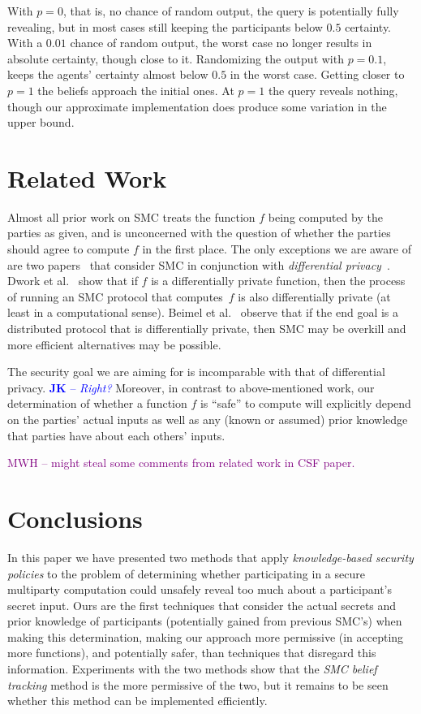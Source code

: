 \documentclass[10pt]{sigplanconf}
\newcommand{\mwh}[1]{\textcolor{purple}{MWH -- #1}}
\newcommand{\jnote}[1]{\textcolor{blue}{{\bf JK} -- \emph{#1}}}
\newcommand{\mwh}[1]{}
\newcommand{\jnote}[1]{}
\begin{document}
With $ p = 0 $, that is, no chance of random output, the query is
potentially fully revealing, but in most cases still keeping the
participants below $ 0.5 $ certainty. With a $ 0.01 $ chance of random
output, the worst case no longer results in absolute certainty, though
close to it. Randomizing the output with $ p = 0.1 $, keeps the
agents' certainty almost below $ 0.5 $ in the worst case.  Getting
closer to $ p = 1 $ the beliefs approach the initial ones. At $ p = 1
$ the query reveals nothing, though our approximate implementation
does produce some variation in the upper bound.

\section{Related Work}
Almost all prior work on SMC treats the function $f$ being computed by
the parties as given, and is unconcerned with the question of whether
the parties should agree to compute $f$ in the first place.  The only
exceptions we are aware of are two
papers~\cite{EC:DKMMN06,C:BeiNisOmr08} that consider SMC in
conjunction with \emph{differential
  privacy}~\cite{TCC:DMNS06,ICALP:Dwork06}.  Dwork et
al.~\cite{EC:DKMMN06} show that if $f$ is a differentially private
function, then the process of running an SMC protocol that
computes~$f$ is also differentially private (at least in a
computational sense). Beimel et al.~\cite{C:BeiNisOmr08} observe that
if the end goal is a distributed protocol that is differentially
private, then SMC may be overkill and more efficient alternatives may
be possible.

The security goal we are aiming for is incomparable with that of
differential privacy. \jnote{Right?}  Moreover, in contrast to
above-mentioned work, our determination of whether a function $f$ is
``safe'' to compute will explicitly depend on the parties' actual
inputs as well as any (known or assumed) prior knowledge that parties
have about each others' inputs.

\mwh{might steal some comments from related work in CSF paper.}

\section{Conclusions}

In this paper we have presented two methods that apply
\emph{knowledge-based security policies} to the problem of determining
whether participating in a secure multiparty computation could
unsafely reveal too much about a participant's secret input.  Ours are
the first techniques that consider the actual secrets and prior
knowledge of participants (potentially gained from previous SMC's)
when making this determination, making our approach more permissive
(in accepting more functions), and potentially safer, than techniques
that disregard this information.  Experiments with the two methods
show that the \emph{SMC belief tracking} method is the more permissive
of the two, but it remains to be seen whether this method can be
implemented efficiently.
\end{document}
